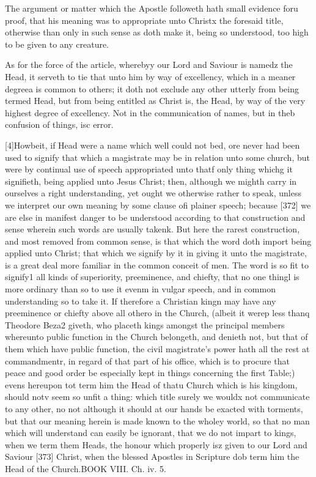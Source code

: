The argument or matter which the Apostle followeth hath small evidence foru proof, that his meaning was to appropriate unto Christx the foresaid title, otherwise than only in such sense as doth make it, being so understood, too high to be given to any creature.

As for the force of the article, wherebyy our Lord and Saviour is namedz the Head, it serveth to tie that unto him by way of excellency, which in a meaner degreea is common to others; it doth not exclude any other utterly from being termed Head, but from being entitled as Christ is, the Head, by way of the very highest degree of excellency. Not in the communication of names, but in theb confusion of things, isc error.

[4]Howbeit, if Head were a name which well could not bed, ore never had been used to signify that which a magistrate may be in relation unto some church, but were by continual use of speech appropriated unto thatf only thing whichg it signifieth, being applied unto Jesus Christ; then, although we mighth carry in ourselves a right understanding, yet ought we otherwise rather to speak, unless we interpret our own meaning by some clause ofi plainer speech; because [372] we are else in manifest danger to be understood according to that construction and sense wherein such words are usually takenk. But here the rarest construction, and most removed from common sense, is that which the word doth import being applied unto Christ; that which we signify by it in giving it unto the magistrate, is a great deal more familiar in the common conceit of men. The word is so fit to signify1 all kinds of superiority, preeminence, and chiefty, that no one thingl is more ordinary than so to use it evenm in vulgar speech, and in common understanding so to take it. If therefore a Christian kingn may have any preeminence or chiefty above all othero in the Church, (albeit it werep less thanq Theodore Beza2 giveth, who placeth kings amongst the principal members whereunto public function in the Church belongeth, and denieth not, but that of them which have public function, the civil magistrate’s power hath all the rest at commandmentr, in regard of that part of his office, which is to procure that peace and good order be especially kept in things concerning the first Table;) evens hereupon tot term him the Head of thatu Church which is his kingdom, should notv seem so unfit a thing: which title surely we wouldx not communicate to any other, no not although it should at our hands be exacted with torments, but that our meaning herein is made known to the wholey world, so that no man which will understand can easily be ignorant, that we do not impart to kings, when we term them Heads, the honour which properly isz given to our Lord and Saviour [373] Christ, when the blessed Apostles in Scripture dob term him the Head of the Church.BOOK VIII. Ch. iv. 5.


